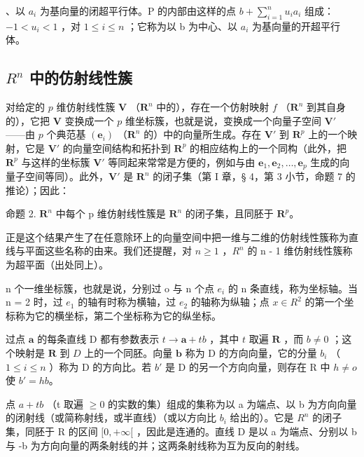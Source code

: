 、以 \(a_{i}\) 为基向量的闭超平行体。P 的内部由这样的点 \(b + \sum_{i=1}^{n} u_{i} a_{i}\) 组成：\(-1 < u_{i} < 1\) ，对 \(1 \leqslant i \leqslant n\) ；它称为以 b 为中心、以 \(a_{i}\) 为基向量的开超平行体。

\subsection{\texorpdfstring{\(R^{n}\) 中的仿射线性簇}{R 的 n 次幂中的仿射线性簇}}

对给定的 \(p\) 维仿射线性簇 \(\mathbf{V}\) （\(\mathbf{R}^n\) 中的），存在一个仿射映射 \(f\) （\(\mathbf{R}^n\) 到其自身的），它把 \(\mathbf{V}\) 变换成一个 \(p\) 维坐标簇，也就是说，变换成一个向量子空间 \(\mathbf{V}'\) ——由 \(p\) 个典范基 \((\boldsymbol{e}_i)\) （\(\mathbf{R}^n\) 的）中的向量所生成。存在 \(\mathbf{V}'\) 到 \(\mathbf{R}^p\) 上的一个映射，它是 \(\mathbf{V}'\) 的向量空间结构和拓扑到 \(\mathbf{R}^p\) 的相应结构上的一个同构（此外，把 \(\mathbf{R}^p\) 与这样的坐标簇 \(\mathbf{V}'\) 等同起来常常是方便的，例如与由 \(\boldsymbol{e}_1, \boldsymbol{e}_2, \ldots, \boldsymbol{e}_p\) 生成的向量子空间等同）。此外，\(\mathbf{V}'\) 是 \(\mathbf{R}^n\) 的闭子集（第 I 章，§ 4，第 3 小节，命题 7 的推论）；因此：

命题 2. \(\mathbf{R}^n\) 中每个 p 维仿射线性簇是 \(\mathbf{R}^n\) 的闭子集，且同胚于 \(\mathbf{R}^p\)。

正是这个结果产生了在任意除环上的向量空间中把一维与二维的仿射线性簇称为直线与平面这些名称的由来。我们还提醒，对 \(n \geqslant 1\) ，\(R^{n}\) 的 n - 1 维仿射线性簇称为超平面（出处同上）。

n 个一维坐标簇，也就是说，分别过 o 与 n 个点 \(e_{i}\) 的 n 条直线，称为坐标轴。当 n = 2 时，过 \(e_{1}\) 的轴有时称为横轴，过 \(e_{2}\) 的轴称为纵轴；点 \(x \in R^{2}\) 的第一个坐标称为它的横坐标，第二个坐标称为它的纵坐标。

过点 \(\pmb{a}\) 的每条直线 D 都有参数表示 \(t \to \pmb{a} + tb\) ，其中 \(t\) 取遍 \(\mathbf{R}\) ，而 \(b \neq 0\) ；这个映射是 \(\mathbf{R}\) 到 \(D\) 上的一个同胚。向量 \(\pmb{b}\) 称为 D 的方向向量，它的分量 \(b_{i}\) （ \(1 \leqslant i \leqslant n\) ）称为 D 的方向比。若 \(b'\) 是 D 的另一个方向向量，则存在 R 中 \(h \neq o\) 使 \(b' = hb\)。

点 \(a + tb\) （t 取遍 \(\geqslant 0\) 的实数的集）组成的集称为以 a 为端点、以 b 为方向向量的闭射线（或简称射线，或半直线）（或以方向比 \(b_{i}\) 给出的）。它是 \(R^{n}\) 的闭子集，同胚于 R 的区间 \([0, +\infty[\) ，因此是连通的。直线 D 是以 a 为端点、分别以 b 与 -b 为方向向量的两条射线的并；这两条射线称为互为反向的射线。

